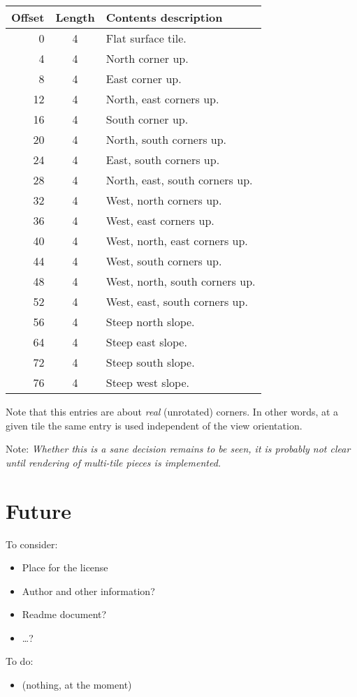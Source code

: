 \documentclass{article}
\begin{document}
\begin{center}
\begin{tabular}{|r|c|l|} \hline
\textbf{Offset} & \textbf{Length} & \textbf{Contents description} \\ \hline
 0 & 4 & Flat surface tile. \\
 4 & 4 & North corner up. \\
 8 & 4 & East corner up. \\
12 & 4 & North, east corners up. \\
16 & 4 & South corner up. \\
20 & 4 & North, south corners up. \\
24 & 4 & East, south corners up. \\
28 & 4 & North, east, south corners up. \\
32 & 4 & West, north corners up. \\
36 & 4 & West, east corners up. \\
40 & 4 & West, north, east corners up. \\
44 & 4 & West, south corners up. \\
48 & 4 & West, north, south corners up. \\
52 & 4 & West, east, south corners up. \\
56 & 4 & Steep north slope. \\
64 & 4 & Steep east slope. \\
72 & 4 & Steep south slope. \\
76 & 4 & Steep west slope. \\ \hline
\end{tabular}
\end{center}
Note that this entries are about \textit{real} (unrotated) corners. In other
words, at a given tile the same entry is used independent of the view
orientation.

Note: \textit{Whether this is a sane decision remains to be seen, it is
probably not clear until rendering of multi-tile pieces is implemented.}

\section{Future}

To consider:
\begin{itemize}
\item Place for the license
\item Author and other information?
\item Readme document?
\item \ldots?
\end{itemize}

To do:
\begin{itemize}
\item (nothing, at the moment)
\end{itemize}
\end{document}
